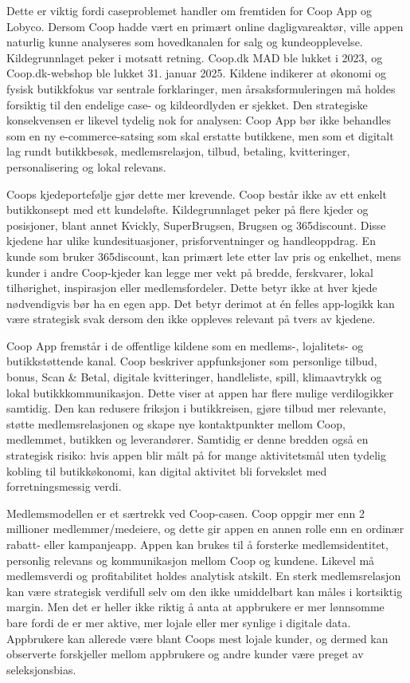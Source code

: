 \documentclass[12pt,a4paper]{article}
\begin{document}
Dette er viktig fordi caseproblemet handler om fremtiden for Coop App og Lobyco. Dersom Coop hadde vært en primært online dagligvareaktør, ville appen naturlig kunne analyseres som hovedkanalen for salg og kundeopplevelse. Kildegrunnlaget peker i motsatt retning. Coop.dk MAD ble lukket i 2023, og Coop.dk-webshop ble lukket 31. januar 2025. Kildene indikerer at økonomi og fysisk butikkfokus var sentrale forklaringer, men årsaksformuleringen må holdes forsiktig til den endelige case- og kildeordlyden er sjekket. Den strategiske konsekvensen er likevel tydelig nok for analysen: Coop App bør ikke behandles som en ny e-commerce-satsing som skal erstatte butikkene, men som et digitalt lag rundt butikkbesøk, medlemsrelasjon, tilbud, betaling, kvitteringer, personalisering og lokal relevans.

Coops kjedeportefølje gjør dette mer krevende. Coop består ikke av ett enkelt butikkonsept med ett kundeløfte. Kildegrunnlaget peker på flere kjeder og posisjoner, blant annet Kvickly, SuperBrugsen, Brugsen og 365discount. Disse kjedene har ulike kundesituasjoner, prisforventninger og handleoppdrag. En kunde som bruker 365discount, kan primært lete etter lav pris og enkelhet, mens kunder i andre Coop-kjeder kan legge mer vekt på bredde, ferskvarer, lokal tilhørighet, inspirasjon eller medlemsfordeler. Dette betyr ikke at hver kjede nødvendigvis bør ha en egen app. Det betyr derimot at én felles app-logikk kan være strategisk svak dersom den ikke oppleves relevant på tvers av kjedene.

Coop App fremstår i de offentlige kildene som en medlems-, lojalitets- og butikkstøttende kanal. Coop beskriver appfunksjoner som personlige tilbud, bonus, Scan \& Betal, digitale kvitteringer, handleliste, spill, klimaavtrykk og lokal butikkkommunikasjon. Dette viser at appen har flere mulige verdilogikker samtidig. Den kan redusere friksjon i butikkreisen, gjøre tilbud mer relevante, støtte medlemsrelasjonen og skape nye kontaktpunkter mellom Coop, medlemmet, butikken og leverandører. Samtidig er denne bredden også en strategisk risiko: hvis appen blir målt på for mange aktivitetsmål uten tydelig kobling til butikkøkonomi, kan digital aktivitet bli forvekslet med forretningsmessig verdi.

Medlemsmodellen er et særtrekk ved Coop-casen. Coop oppgir mer enn 2 millioner medlemmer/medeiere, og dette gir appen en annen rolle enn en ordinær rabatt- eller kampanjeapp. Appen kan brukes til å forsterke medlemsidentitet, personlig relevans og kommunikasjon mellom Coop og kundene. Likevel må medlemsverdi og profitabilitet holdes analytisk atskilt. En sterk medlemsrelasjon kan være strategisk verdifull selv om den ikke umiddelbart kan måles i kortsiktig margin. Men det er heller ikke riktig å anta at appbrukere er mer lønnsomme bare fordi de er mer aktive, mer lojale eller mer synlige i digitale data. Appbrukere kan allerede være blant Coops mest lojale kunder, og dermed kan observerte forskjeller mellom appbrukere og andre kunder være preget av seleksjonsbias.
\end{document}
